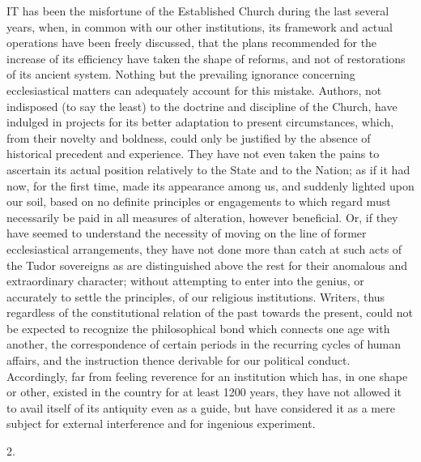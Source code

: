 IT has
been the misfortune of the Established Church during the last several
years, when, in common with our other institutions, its framework and
actual operations have been freely discussed, that the plans
recommended for the increase of its efficiency have taken the shape of
reforms, and not of restorations of its ancient system. Nothing but
the prevailing ignorance concerning ecclesiastical matters can
adequately account for this mistake. Authors, not indisposed (to say
the least) to the doctrine and discipline of the Church, have indulged
in projects for its better adaptation to present circumstances, which,
from their novelty and boldness, could only be justified by the
absence of historical precedent and experience. They have not even
taken the pains to ascertain its actual position relatively to the
State and to the Nation; as if it had now, for the first time, made
its appearance among us, and suddenly lighted upon our soil, based on
no definite principles or engagements to which regard must necessarily
be paid in all measures of alteration, however beneficial. Or, if they
have seemed to understand the necessity of moving on the line of
former ecclesiastical arrangements, they have not done more than catch
at such acts of the Tudor sovereigns as are distinguished above
the rest for their anomalous and extraordinary character; without
attempting to enter into the genius, or accurately to settle the
principles, of our religious institutions. Writers, thus regardless of
the constitutional relation of the past towards the present, could not
be expected to recognize the philosophical bond which connects one age
with another, the correspondence of certain periods in the recurring
cycles of human affairs, and the instruction thence derivable for our
political conduct. Accordingly, far from feeling reverence for an
institution which has, in one shape or other, existed in the country
for at least 1200 years, they have not allowed it to avail itself of
its antiquity even as a guide, but have considered it as a mere
subject for external interference and for ingenious experiment.

2.

